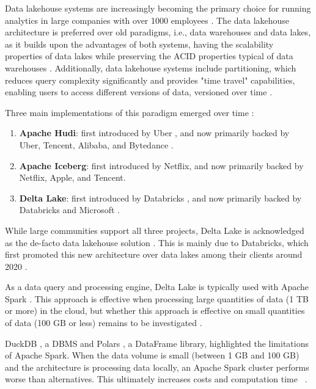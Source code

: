 Data lakehouse systems are increasingly becoming the primary choice for running analytics in large companies with over 1000 employees \cite{StateDataLakehouse2024}. The data lakehouse architecture \cite{lakehouse2021} is preferred over old paradigms, i.e., data warehouses and data lakes, as it builds upon the advantages of both systems, having the scalability properties of data lakes while preserving the \gls{ACID} properties typical of data warehouses \cite{lakehouse2021}. Additionally, data lakehouse systems include partitioning, which reduces query complexity significantly and provides "time travel" capabilities, enabling users to access different versions of data, versioned over time \cite{crociDataLakehouseHype2022}.

Three main implementations of this paradigm emerged over time \cite{ApacheHudiVs}: 
\begin{enumerate}
    \item \textbf{Apache Hudi}: first introduced by Uber \cite{rajaperumalUberEngineeringIncremental2017}, and now primarily backed by Uber, Tencent, Alibaba, and Bytedance .
    \item \textbf{Apache Iceberg}: first introduced by Netflix, and now primarily backed by Netflix, Apple, and Tencent.
    \item \textbf{Delta Lake}: first introduced by Databricks \cite{armbrustDeltaLakeHighperformance2020}, and now primarily backed by Databricks and Microsoft .
\end{enumerate}

While large communities support all three projects, Delta Lake is acknowledged as the de-facto data lakehouse solution \cite{ApacheHudiVs}. This is mainly due to Databricks, which first promoted this new architecture over data lakes among their clients around 2020 \cite{armbrustDeltaLakeHighperformance2020}.

As a data query and processing engine, Delta Lake is typically used with Apache Spark \cite{zahariaApacheSparkUnified2016}. This approach is effective when processing large quantities of data (1 TB or more) in the cloud, but whether this approach is effective on small quantities of data (100 GB or less) remains to be investigated \cite{Khazanchi1801362}.

DuckDB \cite{raasveldtDuckDBEmbeddableAnalytical2019}, a \gls{DBMS} and Polars \cite{vinkWroteOneFastest2021}, a DataFrame library, highlighted the limitations of Apache Spark. When the data volume is small (between 1 GB and 100 GB) and the architecture is processing data locally, an Apache Spark cluster performs worse than alternatives. This ultimately increases costs and computation time ~\cite{BenchmarkResultsSpark,ebergenUpdatesH2OAi2023}.

